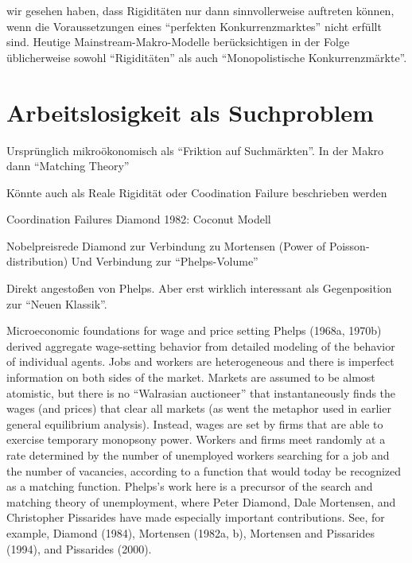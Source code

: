 wir gesehen haben, dass Rigiditäten nur dann sinnvollerweise auftreten können, wenn die Voraussetzungen eines "`perfekten Konkurrenzmarktes"' nicht erfüllt sind. Heutige Mainstream-Makro-Modelle berücksichtigen in der Folge üblicherweise sowohl "`Rigiditäten"' als auch "`Monopolistische Konkurrenzmärkte"'.





\section{Arbeitslosigkeit als Suchproblem}
\label{Suchtheorie}

Ursprünglich mikroökonomisch als "`Friktion auf Suchmärkten"'. In der Makro dann "`Matching Theory"'

Könnte auch als Reale Rigidität oder Coodination Failure beschrieben werden

Coordination Failures
Diamond 1982: Coconut Modell

Nobelpreisrede Diamond zur Verbindung zu Mortensen (Power of Poisson-distribution)
Und Verbindung zur "`Phelps-Volume"'



Direkt angestoßen von Phelps. Aber erst wirklich interessant als Gegenposition zur "`Neuen Klassik"'.
\textcite[S. 683]{Phelps1968}

Microeconomic foundations for wage and price setting
Phelps (1968a, 1970b) derived aggregate wage-setting behavior from detailed modeling of the 
behavior of individual agents. Jobs and workers are heterogeneous and there is imperfect 
information on both sides of the market. Markets are assumed to be almost atomistic, but there is 
no “Walrasian auctioneer” that instantaneously finds the wages (and prices) that clear all markets 
(as went the metaphor used in earlier general equilibrium analysis). Instead, wages are set by 
firms that are able to exercise temporary monopsony power. Workers and firms meet randomly 
at a rate determined by the number of unemployed workers searching for a job and the number of 
vacancies, according to a function that would today be recognized as a matching function. 
Phelps’s work here is a precursor of the search and matching theory of unemployment, where 
Peter Diamond, Dale Mortensen, and Christopher Pissarides have made especially important 
contributions. \parencite{Nobelpreis-Komitee2006}  See, for example, Diamond (1984), Mortensen (1982a, b), Mortensen and Pissarides (1994), and Pissarides 
(2000).



